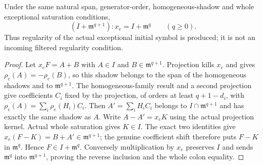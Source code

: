 \begin{theorem}
\label{hir:actual-exceptional-homogeneous-fibre-regular-initial-symbol}
\leanok
Under the same natural span, generator-order, homogeneous-shadow and
whole exceptional saturation conditions,
\[
 (I+\mathfrak m^{q+1}):x_e=I+\mathfrak m^q
 \qquad(q\ge0).
\]
Thus regularity of the actual exceptional initial symbol is produced;
it is not an incoming filtered regularity condition.
\end{theorem}
\begin{proof}
Let $x_eF=A+B$ with $A\in I$ and $B\in\mathfrak m^{q+1}$.
Projection kills $x_e$ and gives $\rho_e(A)=-\rho_e(B)$, so this
shadow belongs to the span of the homogeneous shadows and to
$\mathfrak m^{q+1}$. The homogeneous-family result and a second
projection give coefficients $C_i$ fixed by the projection, of orders
at least $q+1-d_i$, with $\rho_e(A)=\sum_i\rho_e(H_i)C_i$.
Then $A'=\sum_iH_iC_i$ belongs to $I\cap\mathfrak m^{q+1}$ and has
exactly the same shadow as $A$. Write $A-A'=x_eK$ using the actual
projection kernel. Actual whole saturation gives $K\in I$.
The exact two identities give $x_e(F-K)=B+A'\in\mathfrak m^{q+1}$;
the genuine coefficient shift therefore puts $F-K$ in
$\mathfrak m^q$. Hence $F\in I+\mathfrak m^q$.
Conversely multiplication by $x_e$ preserves $I$ and sends
$\mathfrak m^q$ into $\mathfrak m^{q+1}$, proving the reverse
inclusion and the whole colon equality.
\end{proof}

